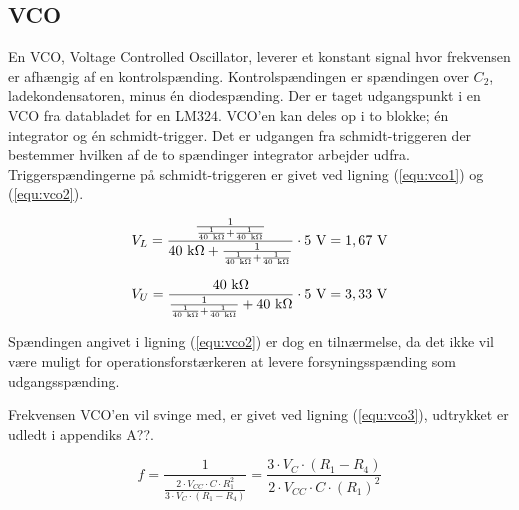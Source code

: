 \subsection*{VCO}
\label{volumenkontrol-vco}

En VCO, Voltage Controlled Oscillator, leverer et konstant signal hvor frekvensen er afhængig af en kontrolspænding. Kontrolspændingen er spændingen over $C_2$, ladekondensatoren, minus én diodespænding. Der er taget udgangspunkt i en VCO fra databladet for en LM324. VCO'en kan deles op i to blokke; én integrator og én schmidt-trigger. Det er udgangen fra schmidt-triggeren der bestemmer hvilken af de to spændinger integrator arbejder udfra. Triggerspændingerne på schmidt-triggeren er givet ved ligning (\ref{equ:vco1}) og (\ref{equ:vco2}). 

\begin{equation}
\label{equ:vco1}
V_L = \mathrm{\frac{\frac{1}{\frac{1}{40~k\ohm} + \frac{1}{40~k\ohm}}}{40~k\ohm + \frac{1}{\frac{1}{40~k\ohm} + \frac{1}{40~k\ohm}}} \cdot 5~V = 1,67~V}
\end{equation}

\begin{equation}
\label{equ:vco2}
V_U = \mathrm{\frac{40~k\ohm}{\frac{1}{\frac{1}{40~k\ohm} + \frac{1}{40~k\ohm}} + 40~k\ohm} \cdot 5~V = 3,33~V}
\end{equation}

Spændingen angivet i ligning (\ref{equ:vco2}) er dog en tilnærmelse, da det ikke vil være muligt for operationsforstærkeren at levere forsyningsspænding som udgangsspænding.

Frekvensen VCO'en vil svinge med, er givet ved ligning (\ref{equ:vco3}), udtrykket er udledt i appendiks A??.

\begin{equation}
\label{equ:vco3}
f = \frac{1}{\frac{2 \cdot V_{CC} \cdot C \cdot R_1^2}{3 \cdot V_C \cdot (R_1 - R_4)}} = \frac{3 \cdot V_C \cdot (R_1 - R_4)}{2 \cdot V_{CC} \cdot C \cdot (R_1)^2}
\end{equation}

